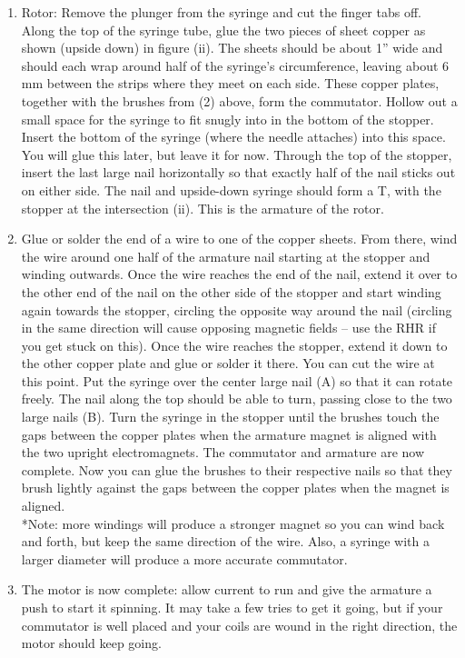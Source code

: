 \begin{itemize}
{\begin{enumerate}
\item{Rotor: Remove the plunger from the syringe and cut the finger tabs off. Along the top of the syringe tube, glue the two pieces of sheet copper as shown (upside down) in figure (ii). The sheets should be about 1” wide and should each wrap around half of the syringe’s circumference, leaving about 6 mm between the strips where they meet on each side. These copper plates, together with the brushes from (2) above, form the commutator. Hollow out a small space for the syringe to fit snugly into in the bottom of the stopper. Insert the bottom of the syringe (where the needle attaches) into this space. You will glue this later, but leave it for now. Through the top of the stopper, insert the last large nail horizontally so that exactly half of the nail sticks out on either side. The nail and upside-down syringe should form a T, with the stopper at the intersection (ii). This is the armature of the rotor.}

\item{Glue or solder the end of a wire to one of the copper sheets. From there, wind the wire around one half of the armature nail starting at the stopper and winding outwards. Once the wire reaches the end of the nail, extend it over to the other end of the nail on the other side of the stopper and start winding again towards the stopper, circling the opposite way around the nail (circling in the same direction will cause opposing magnetic fields – use the RHR if you get stuck on this). Once the wire reaches the stopper, extend it down to the other copper plate and glue or solder it there. You can cut the wire at this point. Put the syringe over the center large nail (A) so that it can rotate freely. The nail along the top should be able to turn, passing close to the two large nails (B). Turn the syringe in the stopper until the brushes touch the gaps between the copper plates when the armature magnet is aligned with the two upright electromagnets. The commutator and armature are now complete. Now you can glue the brushes to their respective nails so that they brush lightly against the gaps between the copper plates when the magnet is aligned.\\
*Note: more windings will produce a stronger magnet so you can wind back and forth, but keep the same direction of the wire. Also, a syringe with a larger diameter will produce a more accurate commutator.}
\item{The motor is now complete: allow current to run and give the armature a push to start it spinning. It may take a few tries to get it going, but if your commutator is well placed and your coils are wound in the right direction, the motor should keep going.}
\end{enumerate}
} %


\end{itemize}
